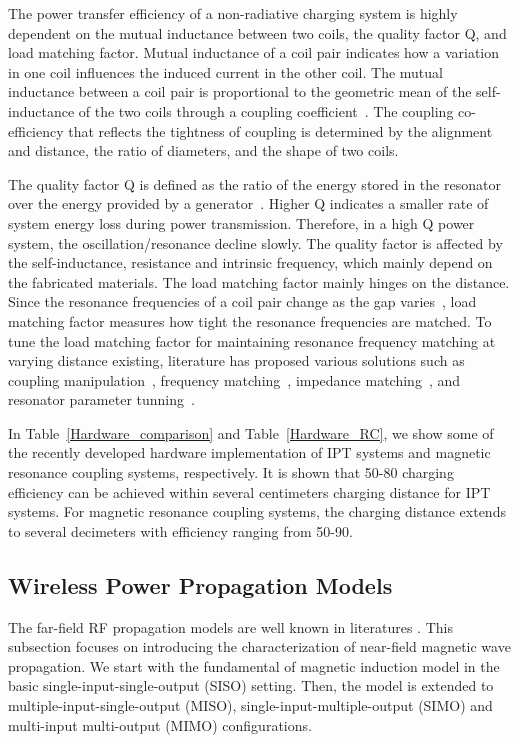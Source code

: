 \documentclass[twocolumn,10pt]{IEEEtran}
\begin{document}
The power transfer efficiency of a non-radiative charging system is highly dependent on the mutual inductance between two coils, the quality factor Q, and load matching factor. Mutual inductance of a coil pair indicates how a variation in one coil influences the induced current in the other coil. The mutual inductance between a coil pair is proportional to the geometric
mean of the self-inductance of the two coils 
through a coupling coefficient~\cite{W.2005Nilsson}. The coupling co-efficiency that reflects the tightness of coupling is determined by the alignment and distance, the ratio of diameters, and the shape of two coils. 

The quality factor Q is defined as the ratio of the energy stored in the resonator over the energy provided by a generator~\cite{T.2009Imura}. Higher Q indicates a smaller rate of system energy loss during power transmission. Therefore, in a high Q power system, the oscillation/resonance decline slowly. The quality factor is affected by the self-inductance, resistance and intrinsic frequency, which mainly depend on the fabricated materials. The load matching factor mainly hinges on the distance. Since the resonance frequencies of a coil pair change as the gap varies~\cite{T.2011Imura}, load matching factor measures how tight the resonance frequencies are matched. To tune the load matching factor for maintaining  resonance frequency matching at varying distance  existing, literature has proposed various solutions such as coupling manipulation~\cite{P.2011Duong}, frequency matching~\cite{P.2011Sample}, impedance matching~\cite{C.2010Beh}, and resonator parameter tunning~\cite{2010I.Awai}.

  

In Table~\ref{Hardware_comparison} and Table~\ref{Hardware_RC}, we show some of the recently developed hardware implementation of IPT systems and magnetic resonance coupling systems, respectively. It is shown that 50-80 charging efficiency can be achieved within several centimeters charging distance for IPT systems. For magnetic resonance coupling systems, the charging distance extends to several decimeters with efficiency ranging from 50-90.



\subsection{Wireless Power Propagation Models}
The far-field RF propagation models are well known in literatures \cite{P.2006Barsocchi,P.2007Almers}. This subsection focuses on introducing the characterization of near-field magnetic wave propagation. We start with the fundamental of magnetic induction model in the basic single-input-single-output (SISO) setting. Then, the model is extended to multiple-input-single-output (MISO), single-input-multiple-output (SIMO) and multi-input multi-output (MIMO) configurations.
 
\end{document}
